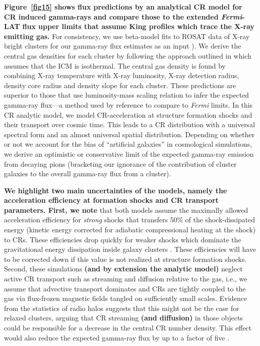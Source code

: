 \documentclass[10pt,aps,pra,reprint,amsmath,amsfonts,amssymb,showpacs,nofootinbib,floatfix]{revtex4-1}
\def\C#1{{\bf #1}}
\newcommand{\Fermi}{{\em Fermi}\xspace}
\begin{document}
\C{Figure~\ref{fig15} shows flux predictions by an analytical CR model
  \cite{2010MNRAS.409..449P} for CR induced gamma-rays and compare those to the
  extended \Fermi-LAT flux upper limits that assume King profiles which trace
  the X-ray emitting gas.}  For consistency, we use beta-model fits to ROSAT
data of X-ray bright clusters for our gamma-ray flux estimates as an input
\cite{2002ApJ...567..716R}). We derive the central gas densities for each
cluster by following the approach outlined in \cite{1999ApJ...517..627M} which
assumes that the ICM is isothermal. The central gas density is found by
combining X-ray temperature with X-ray luminosity, X-ray detection radius,
density core radius and density slope for each cluster. These predictions are
superior to those that use luminosity-mass scaling relation to infer the
expected gamma-ray flux---a method used by reference \cite{2010ApJ...717L..71A}
to compare to \Fermi limits.  In this CR analytic model, we model
CR-acceleration at structure formation shocks and their transport over cosmic
time. This leads to a CR distribution with a universal spectral form and an
almost universal spatial distribution. Depending on whether or not we account
for the bias of ``artificial galaxies'' in cosmological simulations, we derive
an optimistic or conservative limit of the expected gamma-ray emission from
decaying pions (bracketing our ignorance of the contribution of cluster galaxies
to the overall gamma-ray flux from a cluster). 

\C{We highlight two main uncertainties of the models, namely the acceleration
  efficiency at formation shocks and CR transport parameters. First, we note}
that both models assume the maximally allowed acceleration efficiency for {\em
  strong} shocks that transfers 50\% of the shock-dissipated energy (kinetic
energy corrected for adiabatic compressional heating at the shock) to CRs. These
efficiencies drop quickly for weaker shocks \cite{2007A&A...473...41E} which
dominate the gravitational energy dissipation inside galaxy clusters
\cite{2006MNRAS.367..113P}. These efficiencies will have to be corrected down if
this value is not realized at structure formation shocks. Second, these
simulations \C{(and by extension the analytic model)} neglect active CR
transport such as streaming and diffusion relative to the gas, i.e., we assume
that advective transport dominates and CRs are tightly coupled to the gas via
flux-frozen magnetic fields tangled on sufficiently small scales. Evidence from
the statistics of radio halos suggests that this might not be the case for
relaxed clusters, arguing that CR streaming \C{(and diffusion)} in those objects
could be responsible for a decrease in the central CR number density. This
effect would also reduce the expected gamma-ray flux by up to a factor of five
\cite{2011A&A...527A..99E}. 
\end{document}
